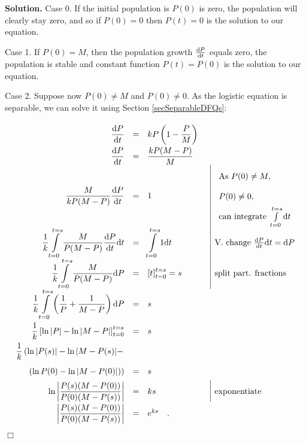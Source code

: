 \documentclass[12pt]{book}
\newenvironment{solution}{\medskip\noindent\textbf{Solution.} }{$\Box$}
\begin{document}
\begin{solution}
Case 0. If the initial population is $P(0)$ is zero, the population will clearly stay zero, and so if $P(0)=0$ then $P(t)=0$ is the solution to our equation.

Case 1. If $P(0)=M$, then the population growth $\frac{{\normalfont \text{d}} P}{{\normalfont \text{d}} t}$ equals zero, the population is stable and constant function $ P(t)=P(0)$ is the solution to our equation.

Case 2. Suppose now $P(0)\neq M$ and $P(0)\neq 0$. As the logistic equation is separable, we can solve it using Section \ref{secSeparableDFQs}:

\begin{equation}\label{eqLogisticEq}
{
\renewcommand*{\arraystretch}{2}
\begin{array}{rcll|l}
\displaystyle \frac{\diff P}{\diff t}&=&\displaystyle k P\left(1-\frac{P}{M}\right)\\
\displaystyle \frac{\diff P}{\diff t}&=&\displaystyle \frac{kP(M-P)}{M}\\
\displaystyle \frac{M}{kP(M-P)}\frac{\diff P}{\diff t}&=&1 &&
\begin{array}{l}
\text{As } P(0)\neq M,\\
P(0)\neq 0,\\
\text{can integrate } \int\limits_{t=0}^{t=s}\diff t
\end{array}\\
\displaystyle \frac{1}{k} \int\limits_{t=0}^{t=s} \frac{M}{P(M-P)}\frac{\diff P}{ \diff t}\diff t&=&\displaystyle \int\limits_{t=0}^{t=s}1\diff t &&\text{V. change } \frac{\diff P}{\diff t}\diff t= \diff P\\
\displaystyle \frac{1}{k} \int\limits_{t=0}^{t=s} \frac{M}{P(M-P)} \diff P &=& \left[t\right]_{t=0}^{t=s} =s &&\text{split part. fractions}\\
\displaystyle \frac{1}{k}\int\limits_{t=0}^{t=s} \left( \frac{1}{P} +\frac{1}{M-P} \right)\diff P &=&s\\
\displaystyle \frac{1}{k}\left[ \ln | P|  - \ln |M-P| \right]_{t=0}^{t=s}&=&s\\
\displaystyle \frac{1}{k}\left(\ln |P(s)|-\ln |M-P(s)|-\right.\\
\left.(\ln P(0)-\ln |M-P(0)|) \right)&=&s\\
\displaystyle \ln \left|\frac{ P(s)(M-P(0))}{P(0)(M-P(s))}\right|&=&k s &&\text{exponentiate}\\
\displaystyle \left|\frac{ P(s)(M-P(0))}{P(0)(M-P(s))}\right|&=&e^{ks} \quad .
\end{array}
}
\end{equation}


\end{solution}
\end{document}
